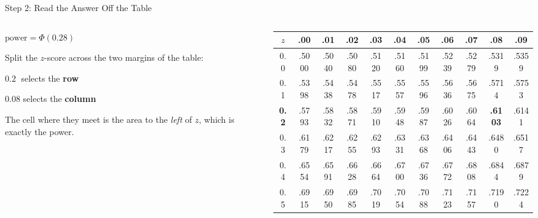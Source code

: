 \documentclass[
  ignorenonframetext,
  aspectratio=169,
]{beamer}
\begin{document}
\begin{frame}{Step 2: Read the Answer Off the Table}
\label{step-2-read-the-answer-off-the-table}
\begin{columns}[T]

\begin{column}{0.30\textwidth}
\vspace{0.6em}

\begin{center}
$\text{power} = \Phi(\mathbf{0.28})$
\end{center}

\vspace{0.5em}

\footnotesize
Split the $z$-score across the two margins of the table:

\vspace{0.4em}

\hspace{0.5em}$\mathbf{0.2}\;$ selects the \textbf{row}

\vspace{0.2em}

\hspace{0.5em}$\mathbf{0.08}$ selects the \textbf{column}

\vspace{0.5em}

The cell where they meet is the area to the \textit{left} of $z$, which is exactly the power.
\end{column}

\begin{column}{0.70\textwidth}
\begin{center}
\scriptsize
\setlength{\tabcolsep}{2.4pt}
\renewcommand{\arraystretch}{1.25}
\begin{tabular}{c|cccccccccc}
\toprule
$z$ & .00 & .01 & .02 & .03 & .04 & .05 & .06 & .07 & \cellcolor{stataccbg}\textbf{.08} & .09 \\
\midrule
0.0 & .5000 & .5040 & .5080 & .5120 & .5160 & .5199 & .5239 & .5279 & \cellcolor{stataccbg}.5319 & .5359 \\
0.1 & .5398 & .5438 & .5478 & .5517 & .5557 & .5596 & .5636 & .5675 & \cellcolor{stataccbg}.5714 & .5753 \\
\cellcolor{stataccbg}\textbf{0.2} & \cellcolor{stataccbg}.5793 & \cellcolor{stataccbg}.5832 & \cellcolor{stataccbg}.5871 & \cellcolor{stataccbg}.5910 & \cellcolor{stataccbg}.5948 & \cellcolor{stataccbg}.5987 & \cellcolor{stataccbg}.6026 & \cellcolor{stataccbg}.6064 & \cellcolor{statorange}\textbf{\color{white}.6103} & \cellcolor{stataccbg}.6141 \\
0.3 & .6179 & .6217 & .6255 & .6293 & .6331 & .6368 & .6406 & .6443 & \cellcolor{stataccbg}.6480 & .6517 \\
0.4 & .6554 & .6591 & .6628 & .6664 & .6700 & .6736 & .6772 & .6808 & \cellcolor{stataccbg}.6844 & .6879 \\
0.5 & .6915 & .6950 & .6985 & .7019 & .7054 & .7088 & .7123 & .7157 & \cellcolor{stataccbg}.7190 & .7224 \\
\bottomrule
\end{tabular}
\end{center}
\end{column}


\end{columns}
\end{frame}
\end{document}
